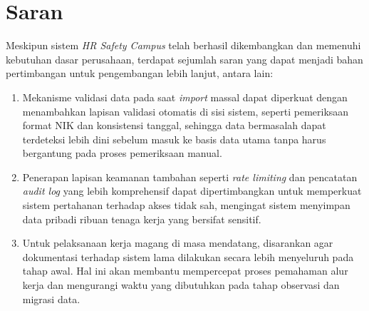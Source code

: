 \section{Saran}

Meskipun sistem \textit{HR Safety Campus} telah berhasil dikembangkan dan
memenuhi kebutuhan dasar perusahaan, terdapat sejumlah saran yang dapat menjadi
bahan pertimbangan untuk pengembangan lebih lanjut, antara lain:

\begin{enumerate}

    \item Mekanisme validasi data pada saat \textit{import} massal dapat
    diperkuat dengan menambahkan lapisan validasi otomatis di sisi sistem,
    seperti pemeriksaan format NIK dan konsistensi tanggal, sehingga data
    bermasalah dapat terdeteksi lebih dini sebelum masuk ke basis data utama
    tanpa harus bergantung pada proses pemeriksaan manual.

    \item Penerapan lapisan keamanan tambahan seperti \textit{rate limiting}
    dan pencatatan \textit{audit log} yang lebih komprehensif dapat
    dipertimbangkan untuk memperkuat sistem pertahanan terhadap akses tidak sah,
    mengingat sistem menyimpan data pribadi ribuan tenaga kerja yang bersifat
    sensitif.

    \item Untuk pelaksanaan kerja magang di masa mendatang, disarankan agar
    dokumentasi terhadap sistem lama dilakukan secara lebih menyeluruh pada tahap
    awal. Hal ini akan membantu mempercepat proses pemahaman alur kerja dan
    mengurangi waktu yang dibutuhkan pada tahap observasi dan migrasi data.
\end{enumerate}